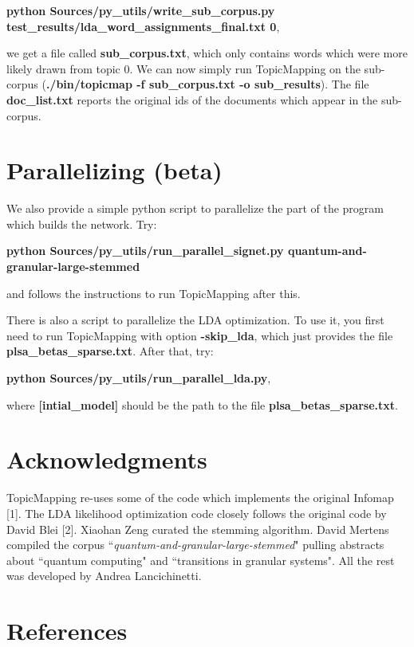 \documentclass[11pt]{article}
\begin{document}
\textbf{python Sources/py\_utils/write\_sub\_corpus.py test\_results/lda\_word\_assignments\_final.txt 0},

we get a file called \textbf{sub\_corpus.txt}, which only contains words which were more likely drawn from topic 0.  We can now simply run TopicMapping on the sub-corpus (\textbf{./bin/topicmap -f sub\_corpus.txt -o sub\_results}). The file \textbf{doc\_list.txt} reports the original ids of the documents which appear in the sub-corpus.


\section{Parallelizing (beta)}

We also provide a simple python script to parallelize the part of the program which builds the network. Try:

\textbf{python Sources/py\_utils/run\_parallel\_signet.py quantum-and-granular-large-stemmed}

and follows the instructions to run TopicMapping after this.

There is also a script to parallelize the LDA optimization. To use it, you first need to run TopicMapping with option \textbf{-skip\_lda}, which just provides the file \textbf{plsa\_betas\_sparse.txt}.  After that, try:

\textbf{python Sources/py\_utils/run\_parallel\_lda.py},

where \textbf{[intial\_model]} should be the path to the file \textbf{plsa\_betas\_sparse.txt}.






\section{Acknowledgments}

TopicMapping re-uses some of the code which implements the original Infomap [1]. The LDA likelihood optimization code closely follows the 
original code by David Blei [2].
Xiaohan Zeng curated the stemming algorithm. David Mertens compiled the corpus ``\textit{quantum-and-granular-large-stemmed}" pulling abstracts about ``quantum computing" and ``transitions in granular systems". 
All the rest was developed by Andrea Lancichinetti.

%
%
%
%
%
%

\section{References}
\end{document}
